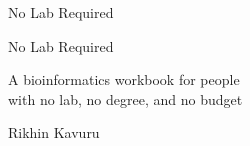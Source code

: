 %

\newcommand{\nlrversion}{1.0}
\newcommand{\nlrreleasedate}{August 2026}
\newcommand{\nlrrepo}{github.com/rikhinkavuru/NoLabRequired}

\frontmatter
\pagestyle{nlrplain}

\setlength{\parindent}{0pt}

\thispagestyle{empty}
\vspace*{1.6in}
{\fontsize{21}{25}\selectfont No Lab Required}
\clearpage

\thispagestyle{empty}\null\clearpage

\thispagestyle{empty}
\vspace*{1.9in}
{\nlrdisplay\fontsize{44}{48}\selectfont No Lab Required}

\vspace{16pt}
{\fontsize{15}{21}\selectfont
A bioinformatics workbook for people\\
with no lab, no degree, and no budget\par}

\vfill
{\fontsize{12}{16}\selectfont Rikhin Kavuru}
\clearpage

